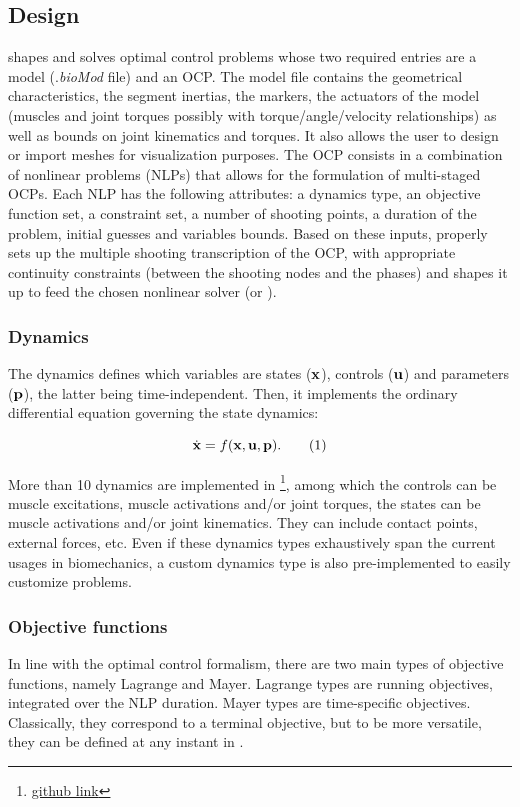 \subsection{Design}
\bioptim shapes and solves optimal control problems whose two required entries are a model (.\textit{bioMod} file) and an OCP.
The model file contains the geometrical characteristics, the segment inertias, the markers, the actuators of the model (muscles and joint torques possibly with torque/angle/velocity relationships) as well as bounds on joint kinematics and torques. 
It also allows the user to design or import meshes for visualization purposes.
The OCP consists in a combination of nonlinear problems (NLPs) that allows for the formulation of multi-staged OCPs. 
Each NLP has the following attributes: a dynamics type, an objective function set, a constraint set, a number of shooting points, a duration of the problem, initial guesses and variables bounds.
Based on these inputs, \bioptim properly sets up the multiple shooting transcription of the OCP, with appropriate continuity constraints (between the shooting nodes and the phases) and shapes it up to feed the chosen nonlinear solver (\ipopt or \acados). 

\subsubsection{Dynamics}
The dynamics defines which variables are states ($\mathbf{x}$), controls ($\mathbf{u}$) and parameters ($\mathbf{p}$), the latter being time-independent.
Then, it implements the ordinary differential equation governing the state dynamics:

\[
\dstate = f(\state, \control, \param).
\addtag
\label{eq:state_transition}
\]

\noindent More than 10 dynamics are implemented in \bioptim \footnote{\href{https://github.com/pyomeca/bioptim/blob/master/bioptim/dynamics/dynamics_functions.py}{github link}}, among which the controls can be muscle excitations, muscle activations and/or joint torques, the states can be muscle activations and/or joint kinematics.
They can include contact points, external forces, etc.
Even if these dynamics types exhaustively span the current usages in biomechanics, a custom dynamics type is also pre-implemented to easily customize problems.

\subsubsection{Objective functions}
In line with the optimal control formalism, there are two main types of objective functions, namely Lagrange and Mayer. 
Lagrange types are running objectives, integrated over the NLP duration. Mayer types are time-specific objectives. 
Classically, they correspond to a terminal objective, but to be more versatile, they can be defined at any instant in \bioptim.

